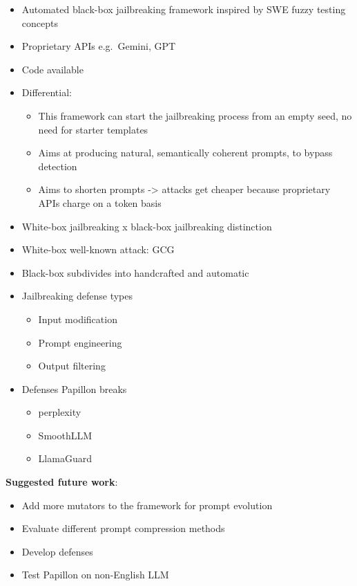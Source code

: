 \documentclass[
  letterpaper,
  DIV=11,
  numbers=noendperiod]{scrartcl}
\providecommand{\tightlist}{%
  \setlength{\itemsep}{0pt}\setlength{\parskip}{0pt}}
\begin{document}
\begin{itemize}
\tightlist
\item
  Automated black-box jailbreaking framework inspired by SWE fuzzy
  testing concepts
\item
  Proprietary APIs e.g.~Gemini, GPT
\item
  Code available
\item
  Differential:

  \begin{itemize}
  \tightlist
  \item
    This framework can start the jailbreaking process from an empty
    seed, no need for starter templates
  \item
    Aims at producing natural, semantically coherent prompts, to bypass
    detection
  \item
    Aims to shorten prompts -\textgreater{} attacks get cheaper because
    proprietary APIs charge on a token basis
  \end{itemize}
\item
  White-box jailbreaking x black-box jailbreaking distinction
\item
  White-box well-known attack: GCG
\item
  Black-box subdivides into handcrafted and automatic
\item
  Jailbreaking defense types

  \begin{itemize}
  \tightlist
  \item
    Input modification
  \item
    Prompt engineering
  \item
    Output filtering
  \end{itemize}
\item
  Defenses Papillon breaks

  \begin{itemize}
  \tightlist
  \item
    perplexity
  \item
    SmoothLLM
  \item
    LlamaGuard
  \end{itemize}
\end{itemize}

\textbf{Suggested future work}:

\begin{itemize}
\tightlist
\item
  Add more mutators to the framework for prompt evolution
\item
  Evaluate different prompt compression methods
\item
  Develop defenses
\item
  Test Papillon on non-English LLM
\end{itemize}
\end{document}
